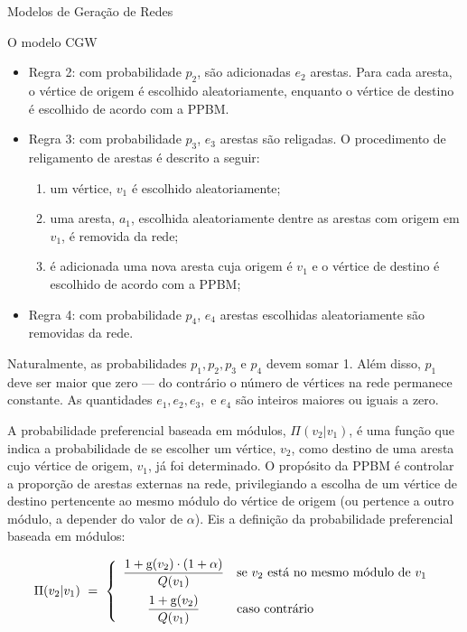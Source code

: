 \begin{section}{Modelos de Geração de Redes}
\begin{subsection}{O modelo CGW}
\begin{itemize}
	\item Regra 2: com probabilidade $p_2$, são adicionadas $e_2$ arestas. Para cada aresta, o vértice de origem é escolhido aleatoriamente, enquanto o vértice de destino é escolhido de acordo com a PPBM.
	
	\item Regra 3: com probabilidade $p_3$, $e_3$ arestas são religadas. O procedimento de religamento de arestas é descrito a seguir:
	
	\begin{enumerate}
		\item um vértice, $v_1$ é escolhido aleatoriamente;
		\item uma aresta, $a_1$, escolhida aleatoriamente dentre as arestas com origem em $v_1$, é removida da rede;
		\item é adicionada uma nova aresta cuja origem é $v_1$ e o vértice de destino é escolhido de acordo com a PPBM;
	\end{enumerate}
	
	\item Regra 4: com probabilidade $p_4$, $e_4$ arestas escolhidas aleatoriamente são removidas da rede.
	
\end{itemize}

Naturalmente, as probabilidades $p_1, p_2, p_3$ e $p_4$ devem somar 1. Além disso, $p_1$ deve ser maior que zero --- do contrário o número de vértices na rede permanece constante. As quantidades $e_1, e_2, e_3, $ e $e_4$ são inteiros maiores ou iguais a zero.

A probabilidade preferencial baseada em módulos, $\Pi(v_2|v_1)$, é uma função que indica a probabilidade de se escolher um vértice, $v_2$, como destino de uma aresta cujo vértice de origem, $v_1$, já foi determinado. O propósito da PPBM é controlar a proporção de arestas externas na rede, privilegiando a escolha de um vértice de destino pertencente ao mesmo módulo do vértice de origem (ou pertence a outro módulo, a depender do valor de $\alpha$). Eis a definição da probabilidade preferencial baseada em módulos:

$$
\Pi (v_2|v_1) ~=~
\left\{
\begin{array}{cl}
\dfrac{1 + \mathrm{g}(v_2) \cdot (1 + \alpha)}{Q(v_1)} 
  & \mbox{se $v_2$ está no mesmo módulo de $v_1$} \vspace{0.5em} \\ 
\dfrac{1 + \mathrm{g}(v_2)}{Q(v_1)} 
  & \mbox{caso contrário}
\end{array}
\right.
$$


\end{subsection}
\end{section}
